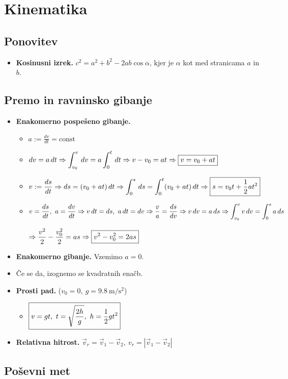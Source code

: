 \section{Kinematika}
\subsection{Ponovitev}
\begin{itemize}
    \item \textbf{Kosinusni izrek.} \(c^2 = a^2 + b^2 - 2ab \cos \alpha\), kjer je \(\alpha\) kot med stranicama \(a\) in \(b\).
\end{itemize}

\subsection{Premo in ravninsko gibanje}
\begin{itemize}
    \item \textbf{Enakomerno pospešeno gibanje.} 
    \begin{itemize}
        \item \(a := \frac{dv}{dt} = \text{const}\)
        \item \(\displaystyle dv = a \, dt \Rightarrow \int_{v_0}^{v} \, dv = a \int_{0}^{t} \, dt \Rightarrow v - v_0 = at \Rightarrow  \boxed{v = v_0 + at}\)
        \item \(\displaystyle v := \frac{ds}{dt} \Rightarrow ds = (v_0 + at) \, dt \Rightarrow \int_{0}^{s} \, ds = \int_{0}^{t} (v_0 + at) \, dt \Rightarrow \boxed{s = v_0t + \frac{1}{2}at^2}\)
        \item \(\displaystyle v = \frac{ds}{dt}, \ a = \frac{dv}{dt} \Rightarrow v \, dt = ds, \ a \, dt = dv \Rightarrow \frac{v}{a} = \frac{ds}{dv} \Rightarrow v \, dv = a \, ds \Rightarrow \int_{v_0}^{v} v \, dv = \int_{0}^{s} a \, ds\)
        
        \(\displaystyle \Rightarrow \frac{v^2}{2} - \frac{v_0^2}{2} = as \Rightarrow \boxed{v^2 - v_0^2 = 2as}\)
    \end{itemize}
    \item \textbf{Enakomerno gibanje.} Vzemimo \(a = 0\).
    \item Če se da, izognemo se kvadratnih enačb.
    \item \textbf{Prosti pad.} (\(v_0 = 0, \  g = 9.8 \  \text{m} / \text{s}^2\))
    \begin{itemize}
        \item \(\displaystyle \boxed{v = gt, \ t = \sqrt{\frac{2h}{g}}, \ h = \frac{1}{2} g t^2}\)
    \end{itemize}
    \item \textbf{Relativna hitrost.} \(\vec{v}_r = \vec{v}_1 - \vec{v}_2, \ v_r = |\vec{v}_1 - \vec{v}_2|\)
\end{itemize}

\subsection{Poševni met}